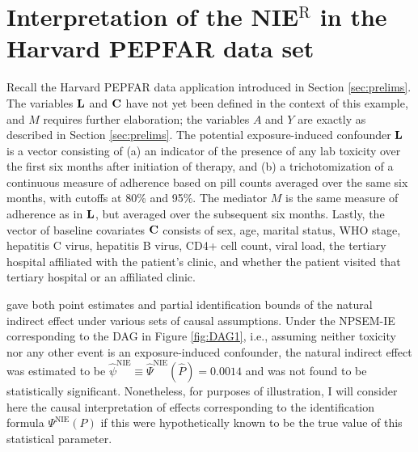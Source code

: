 \documentclass[12pt]{article}
\begin{document}
\section{Interpretation of the NIE$^\text{R}$ in the Harvard PEPFAR data set}
\label{sec:pepfar}
Recall the Harvard PEPFAR data application introduced in Section \ref{sec:prelims}. The variables $\bf L$ and $\bf C$ have not yet been defined in the context of this example, and $M$ requires further elaboration; the variables $A$ and $Y$ are exactly as described in Section \ref{sec:prelims}. The potential exposure-induced confounder $\bf L$ is a vector consisting of (a) an indicator of the presence of any lab toxicity over the first six months after initiation of therapy, and (b) a trichotomization of a continuous measure of adherence based on pill counts averaged over the same six months, with cutoffs at 80\% and 95\%. The mediator $M$ is the same measure of adherence as in $\bf L$, but averaged over the subsequent six months. %
Lastly, the vector of baseline covariates $\bf C$ consists of sex, age, marital status, WHO stage, hepatitis C virus, hepatitis B virus, CD4+ cell count, viral load, the tertiary hospital affiliated with the patient’s clinic, and whether the patient visited that tertiary hospital or an affiliated clinic.

\cite{miles2017partial} gave both point estimates and partial identification bounds of the natural indirect effect under various sets of causal assumptions. %
Under the NPSEM-IE corresponding to the DAG in Figure \ref{fig:DAG1}, i.e., assuming neither toxicity nor any other event is an exposure-induced confounder, the natural indirect effect was estimated to be $\hat{\psi}^{\text{NIE}}\equiv \hat{\Psi}^{\text{NIE}}(\hat{P})=0.0014$ and was not found to be statistically significant. Nonetheless, for purposes of illustration, I will consider here the causal interpretation of effects corresponding to the identification formula $\Psi^{\text{NIE}}(P)$ if this were hypothetically known to be the true value of this statistical parameter.
\end{document}
